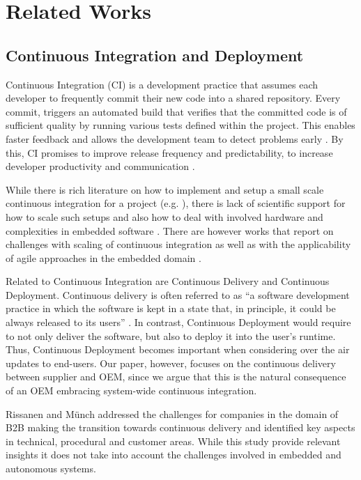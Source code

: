 \section{Related Works}\label{sec:relatedWorks}

\subsection{Continuous Integration and Deployment}

Continuous Integration (CI) is a development practice that assumes each developer to frequently commit their new code into a shared repository.
Every commit, triggers an automated build that verifies that the committed code is of sufficient quality by running various tests defined within the project. This enables faster feedback and allows the development team to detect problems early \cite{Fowler2006}.
By this, CI promises to improve release frequency and predictability, to increase developer productivity and communication \cite{Stahl2014}. 

While there is %
rich literature on how to implement and setup a small scale continuous integration for a project (e.g. \cite{Fowler2006,Neely2013}), there is lack of scientific support for how to scale such setups and also how to deal with involved hardware and complexities in embedded software \cite{Debbiche2014}. There are however works that report on challenges with scaling of continuous integration \cite{Roberts2004,Rogers2004} as well as with the applicability of agile approaches in the embedded domain \cite{Eklund2012a}.

Related to Continuous Integration are Continuous Delivery and Continuous Deployment.
Continuous delivery is often referred to as ``a software development practice in which the software is kept in a state that, in principle, it could be always released to its users'' \cite{Humble2010}. 
In contrast, Continuous Deployment would require to not only deliver the software, but also to deploy it into the user's runtime.
Thus, Continuous Deployment becomes important when considering over the air updates to end-users.
Our paper, however, focuses on the continuous delivery between supplier and OEM, since we argue that this is the natural consequence of an OEM embracing system-wide continuous integration.

Rissanen and M\"unch \cite{Rissanen2015} addressed the challenges for companies in the domain of B2B making the transition towards continuous delivery and identified key aspects in technical, procedural and customer areas. While this study provide relevant insights it does not take into account the challenges involved in embedded and autonomous systems. 


